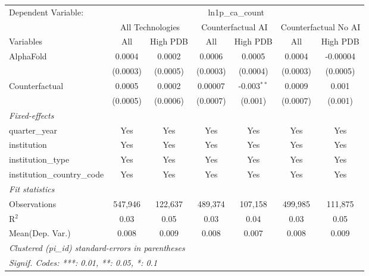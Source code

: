 \begingroup
\centering
\begin{tabular}{lcccccc}
   \tabularnewline \midrule \midrule
   Dependent Variable: & \multicolumn{6}{c}{ln1p\_ca\_count}\\
 & \multicolumn{2}{c}{All Technologies} & \multicolumn{2}{c}{Counterfactual AI} & \multicolumn{2}{c}{Counterfactual No AI} \\
\cmidrule(lr){1-1}\cmidrule(lr){2-3} \cmidrule(lr){4-5} \cmidrule(lr){6-7}
Variables & \multicolumn{1}{c}{All} & \multicolumn{1}{c}{High PDB} & \multicolumn{1}{c}{All} & \multicolumn{1}{c}{High PDB} & \multicolumn{1}{c}{All} & \multicolumn{1}{c}{High PDB} \\
\cmidrule(lr){1-1}\cmidrule(lr){2-2} \cmidrule(lr){3-3} \cmidrule(lr){4-4} \cmidrule(lr){5-5} \cmidrule(lr){6-6} \cmidrule(lr){7-7}
   AlphaFold                    & 0.0004   & 0.0002   & 0.0006   & 0.0005        & 0.0004   & -0.00004\\   
                                & (0.0003) & (0.0005) & (0.0003) & (0.0004)      & (0.0003) & (0.0005)\\   
   Counterfactual               & 0.0005   & 0.0002   & 0.00007  & -0.003$^{**}$ & 0.0009   & 0.001\\   
                                & (0.0005) & (0.0006) & (0.0007) & (0.001)       & (0.0007) & (0.001)\\   
   \midrule
   \emph{Fixed-effects}\\
   quarter\_year                & Yes      & Yes      & Yes      & Yes           & Yes      & Yes\\  
   institution                  & Yes      & Yes      & Yes      & Yes           & Yes      & Yes\\  
   institution\_type            & Yes      & Yes      & Yes      & Yes           & Yes      & Yes\\  
   institution\_country\_code   & Yes      & Yes      & Yes      & Yes           & Yes      & Yes\\  
   \midrule
   \emph{Fit statistics}\\
   Observations                 & 547,946  & 122,637  & 489,374  & 107,158       & 499,985  & 111,875\\  
   R$^2$                        & 0.03     & 0.05     & 0.03     & 0.04          & 0.03     & 0.05\\  
Mean(Dep. Var.) & 0.008 & 0.009 & 0.008 & 0.007 & 0.008 & 0.009 \\
   \midrule \midrule
   \multicolumn{7}{l}{\emph{Clustered (pi\_id) standard-errors in parentheses}}\\
   \multicolumn{7}{l}{\emph{Signif. Codes: ***: 0.01, **: 0.05, *: 0.1}}\\
\end{tabular}
\par\endgroup
